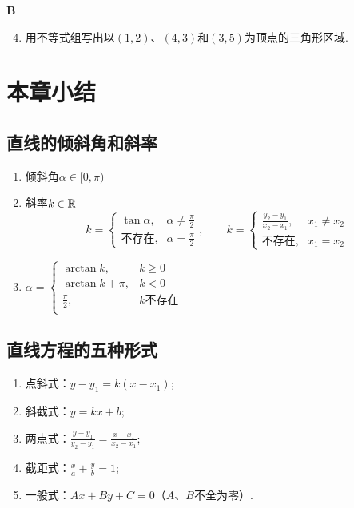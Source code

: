 \begin{center}
    \bfseries B
\end{center}

\begin{enumerate}\setcounter{enumi}{3}
    \item 用不等式组写出以$(1,2)$、$(4,3)$和$(3,5)$为顶点的三角形区域.
\end{enumerate}

\section{本章小结}

\subsection{直线的倾斜角和斜率}
\begin{enumerate}
    \item 倾斜角$\alpha\in[0,\pi)$
    \item 斜率$k\in\mathbb{R}$
\[k=\begin{cases}
    \tan\alpha, & \alpha\ne \frac{\pi}{2}\\[1.5ex]
    \text{不存在}, &\alpha=\frac{\pi}{2}
\end{cases},\qquad k=\begin{cases}
    \frac{y_2-y_1}{x_2-x_1}, & x_1\ne x_2\\[1.5ex]
    \text{不存在}, &x_1=x_{2}
\end{cases}\]

\item $ \alpha=\begin{cases}
   \arctan k ,& k\ge 0\\
   \arctan k+\pi ,& k< 0\\
   \frac{\pi}{2},&\text{$k$不存在}\\[1.5ex]
\end{cases}$
\end{enumerate}

\subsection{直线方程的五种形式}
\begin{enumerate}
\item 点斜式：$y-y_1=k(x-x_1)$;
\item 斜截式：$y=kx+b$;
\item 两点式：$\frac{y-y_1}{y_2-y_1}=\frac{x-x_1}{x_2-x_1}$;
\item 截距式：$\frac{x}{a}+\frac{y}{b}=1$;
\item 一般式：$Ax+By+C=0$（$A$、$B$不全为零）.
\end{enumerate}

